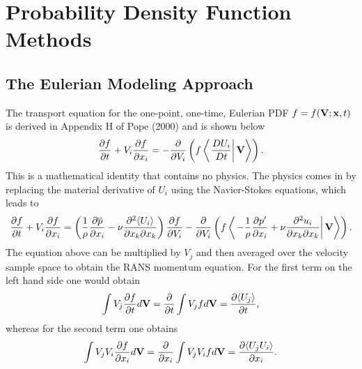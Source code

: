 \documentclass[oneside,a4paper,11pt]{report}
\newcommand{\pavg}{\overline{p}}
\newcommand{\pfluc}{p'}
\newcommand{\uiavg}{\langle U_i \rangle}
\newcommand{\ujavg}{\langle U_j \rangle}
\newcommand{\uifluc}{u_i}
\begin{document}
%
\chapter{Probability Density Function Methods}
%

\section{The Eulerian Modeling Approach}

The transport equation for the one-point, one-time, Eulerian PDF $f=f(\mathbf{V} ;\mathbf{x},t)$ is derived in Appendix H of Pope (2000) and is shown below
\begin{equation}
\frac{\partial f}{\partial t} + V_i\frac{\partial f}{\partial x_i} = -\frac{\partial}{\partial V_i} \left ( f \left < \left . \frac{DU_i}{Dt} \right | \mathbf{V} \right > \right ).
\end{equation}
This is a mathematical identity that contains no physics. The physics comes in by replacing the material derivative of $U_i$ using the Navier-Stokes equations, which leads to
\begin{equation}
\label{pdf_ns}
\frac{\partial f}{\partial t} + V_i\frac{\partial f}{\partial x_i} = \left ( \frac{1}{\rho} \frac{\partial \pavg}{\partial x_i} -\nu \frac{\partial^2 \uiavg}{\partial x_k \partial x_k} \right) \frac{\partial f}{\partial V_i} - \frac{\partial}{\partial V_i} \left ( f \left < \left . - \frac{1}{\rho} \frac{\partial \pfluc}{\partial x_i} +  \nu \frac{\partial ^2 \uifluc}{\partial x_k \partial x_k} \right | \Vvec \right > \right ).
\end{equation}
The equation above can be multiplied by $V_j$ and then averaged over the velocity sample space to obtain the RANS momentum equation. For the first term on the left hand side one would obtain
\begin{equation}
\int V_j \frac{\partial f}{\partial t} d\Vvec = \frac{\partial}{\partial t} \int V_j f d\Vvec = \frac{\partial \ujavg}{\partial t},
\end{equation} 
whereas for the second term one obtains
\begin{equation}
\int V_j V_i \frac{\partial f}{\partial x_i} d\mathbf{V} = \frac{\partial}{\partial x_i} \int V_j V_i f d\mathbf{V} = \frac{\partial \langle U_j U_i \rangle}{\partial x_i}.
\end{equation} 
\end{document}
